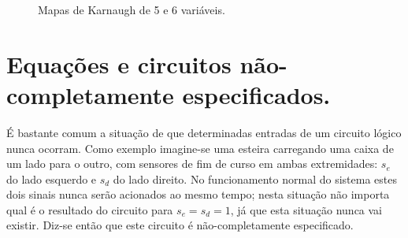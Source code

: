 \begin{figure}
\centering
{}
\caption{Mapas de Karnaugh de 5 e 6 variáveis.}\label{fig:karnaughzaos}
\end{figure}
\clearpage

\section{Equações e circuitos não-completamente especificados.}
\label{sec:nao-completamente}

É bastante comum a situação de que determinadas entradas de um circuito lógico nunca ocorram. Como exemplo imagine-se uma esteira carregando uma caixa de um lado para o outro, com sensores de fim de curso em ambas extremidades: $s_e$ do lado esquerdo e $s_d$ do lado direito. No funcionamento normal do sistema estes dois sinais nunca serão acionados ao mesmo tempo; nesta situação não importa qual é o resultado do circuito para $s_e=s_d=1$, já que esta situação nunca vai existir. Diz-se então que este circuito é não-completamente especificado.

